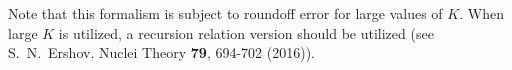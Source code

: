 Note that this formalism is subject to roundoff error for large values of $K$. When large $K$ is utilized, a recursion relation version should be utilized (see S.\ N.\ Ershov. Nuclei Theory \textbf{79}, 694-702 (2016)).



